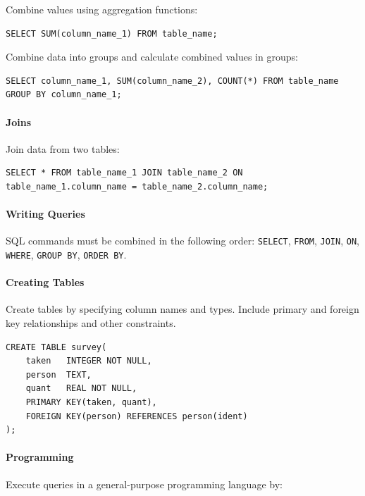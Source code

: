 \documentclass[]{book}
\begin{document}
Combine values using aggregation functions:

\begin{verbatim}
SELECT SUM(column_name_1) FROM table_name;
\end{verbatim}

Combine data into groups and calculate combined values in groups:

\begin{verbatim}
SELECT column_name_1, SUM(column_name_2), COUNT(*) FROM table_name GROUP BY column_name_1;
\end{verbatim}

\mbox{}\paragraph{Joins}

Join data from two tables:

\begin{verbatim}
SELECT * FROM table_name_1 JOIN table_name_2 ON table_name_1.column_name = table_name_2.column_name;
\end{verbatim}

\mbox{}\paragraph{Writing Queries}

SQL commands must be combined in the following order: \texttt{SELECT},
\texttt{FROM}, \texttt{JOIN}, \texttt{ON}, \texttt{WHERE},
\texttt{GROUP BY}, \texttt{ORDER BY}.

\mbox{}\paragraph{Creating Tables}

Create tables by specifying column names and types. Include primary and
foreign key relationships and other constraints.

\begin{verbatim}
CREATE TABLE survey(
    taken   INTEGER NOT NULL,
    person  TEXT,
    quant   REAL NOT NULL,
    PRIMARY KEY(taken, quant),
    FOREIGN KEY(person) REFERENCES person(ident)
);
\end{verbatim}

\mbox{}\paragraph{Programming}

Execute queries in a general-purpose programming language by:
\end{document}
